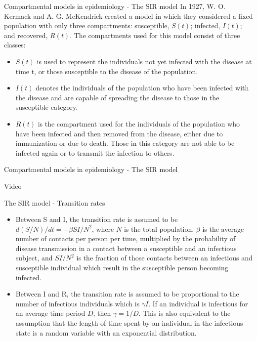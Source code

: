\documentclass[
  notheorems,
  aspectratio=54,
]{beamer}
\begin{document}
\begin{frame}{Compartmental models in epidemiology - The SIR model}
    In 1927, W. O. Kermack and A. G. McKendrick created a model in which they considered a fixed population with only three compartments: susceptible, 
${\displaystyle S(t)}$; infected, 
${\displaystyle I(t)}$; and recovered, 
${\displaystyle R(t)}$. The compartments used for this model consist of three classes:
  \begin{itemize}
    \item ${\displaystyle S(t)}$ is used to represent the individuals not yet infected with the disease at time t, or those susceptible to the disease of the population.
    \item ${\displaystyle I(t)}$ denotes the individuals of the population who have been infected with the disease and are capable of spreading the disease to those in the susceptible category.
    \item ${\displaystyle R(t)}$ is the compartment used for the individuals of the population who have been infected and then removed from the disease, either due to immunization or due to death. Those in this category are not able to be infected again or to transmit the infection to others.
  \end{itemize}
\end{frame}

\begin{frame}{Compartmental models in epidemiology - The SIR model}
  \begin{center}
  Video
  \end{center}
\end{frame}

\begin{frame}{The SIR model - Transition rates}
  \begin{itemize}
    \item Between S and I, the transition rate is assumed to be 
${\displaystyle d(S/N)/dt=-\beta SI/N^{2}}$, where 
${\displaystyle N}$ is the total population, 
${\displaystyle \beta }$ is the average number of contacts per person per time, multiplied by the probability of disease transmission in a contact between a susceptible and an infectious subject, and 
${\displaystyle SI/N^{2}}$ is the fraction of those contacts between an infectious and susceptible individual which result in the susceptible person becoming infected.

  \item Between I and R, the transition rate is assumed to be proportional to the number of infectious individuals which is 
${\displaystyle \gamma I}$. If an individual is infectious for an average time period 
${\displaystyle D}$, then 
${\displaystyle \gamma =1/D}$.
This is also equivalent to the assumption that the length of time spent by an individual in the infectious state is a random variable with an exponential distribution.
  \end{itemize}
\end{frame}
\end{document}
